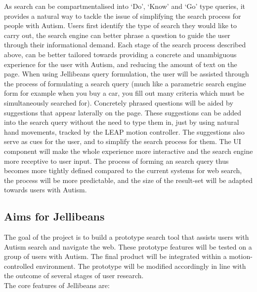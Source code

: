 \documentclass[a4paper, 11pt]{article}
\begin{document}
As search can be compartmentalised into `Do', `Know' and `Go' type queries, it provides a natural way to tackle the issue of simplifying the search process for people with Autism. Users first identify the type of search they would like to carry out, the search engine can better phrase a question to guide the user through their informational demand. Each stage of the search process described above, can be better tailored towards providing a concrete and unambiguous experience for the user with Autism, and reducing the amount of text on the page. When using Jellibeans query formulation, the user will be assisted through the process of formulating a search query (much like a parametric search engine form for example when you buy a car, you fill out many criteria which must be simultaneously searched for). Concretely phrased questions will be aided by suggestions that appear laterally on the page. These suggestions can be added into the search query without the need to type them in, just by using natural hand movements, tracked by the LEAP motion controller. The suggestions also serve as cues for the user, and to simplify the search process for them.  The UI component will make the whole experience more interactive and the search engine more receptive to user input. The process of forming an search query thus becomes more tightly defined compared to the current systems for web search, the process will be more predictable, and the size of the result-set will be adapted towards users with Autism.  

\subsection {Aims for Jellibeans}
The goal of the project is to build a prototype search tool that assists users with Autism search and navigate the web. These prototype features will be tested on a group of users with Autism. The final product will be integrated within a motion-controlled environment. The prototype will be modified accordingly in line with the outcome of several stages of user research.\\ The core features of Jellibeans are:
\end{document}
